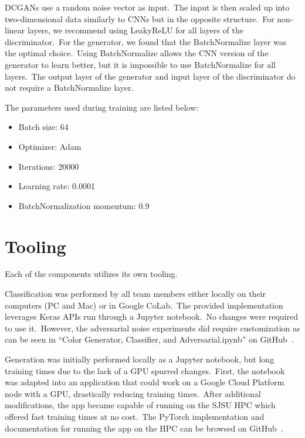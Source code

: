 \documentclass[conference]{IEEEtran}
\begin{document}
    DCGANs use a random noise vector as input.\ The input is then scaled up into two-dimensional data similarly to CNNs but in the opposite structure.\ For non-linear layers, we recommend using LeakyReLU for all layers of the discriminator.\ For the generator, we found that the BatchNormalize layer was the optimal choice.\ Using BatchNormalize allows the CNN version of the generator to learn better, but it is impossible to use BatchNormalize for all layers.\ The output layer of the generator and input layer of the discriminator do not require a BatchNormalize layer.

    The parameters used during training are listed below:

    \begin{itemize}
        \item Batch size: 64
        \item Optimizer: Adam
        \item Iterations: 20000
        \item Learning rate: 0.0001
        \item BatchNormalization momentum: 0.9
    \end{itemize}

    \section{Tooling}\label{sec:tools}

    Each of the components utilizes its own tooling.

    Classification was performed by all team members either locally on their computers (PC and Mac) or in Google CoLab.\ The provided implementation leverages Keras APIs run through a Jupyter notebook.\ No changes were required to use it.\ However, the adversarial noise experiments did require customization as can be seen in ``Color Generator, Classifier, and Adversarial.ipynb'' on GitHub~\cite{e-in-style}.

    Generation was initially performed locally as a Jupyter notebook, but long training times due to the lack of a GPU spurred changes.\ First, the notebook was adapted into an application that could work on a Google Cloud Platform node with a GPU, drastically reducing training times.\ After additional modifications, the app became capable of running on the SJSU HPC which offered fast training times at no cost.\ The PyTorch implementation and documentation for running the app on the HPC can be browsed on GitHub~\cite{pytorch-generative-model-collections}.
\end{document}
